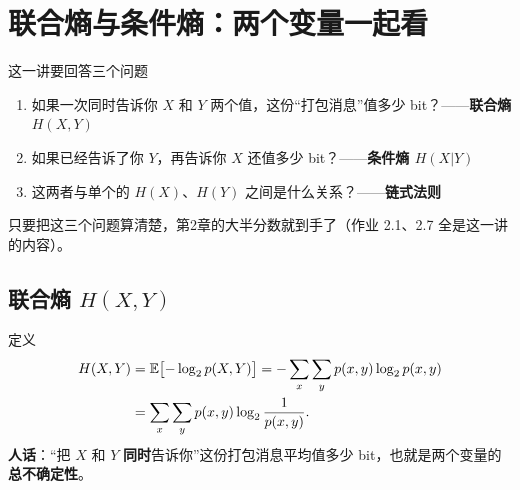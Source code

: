 \section{联合熵与条件熵：两个变量一起看}

\begin{idea}{这一讲要回答三个问题}
\begin{enumerate}[leftmargin=1.6em,itemsep=2pt,topsep=2pt]
  \item 如果一次同时告诉你 $X$ 和 $Y$ 两个值，这份“打包消息”值多少 bit？——\textbf{联合熵 $H(X,Y)$}
  \item 如果已经告诉了你 $Y$，再告诉你 $X$ 还值多少 bit？——\textbf{条件熵 $H(X|Y)$}
  \item 这两者与单个的 $H(X)$、$H(Y)$ 之间是什么关系？——\textbf{链式法则}
\end{enumerate}
只要把这三个问题算清楚，第2章的大半分数就到手了（作业 2.1、2.7 全是这一讲的内容）。
\end{idea}

\subsection{联合熵 $H(X,Y)$}

\begin{defbox}{定义}
\begin{align*}
H\!\left(X,Y\right)&=\operatorname{\mathbb{E}}\bigl[-\log_{2} p(X,Y)\bigr]
=-\sum_{x}\sum_{y}p(x,y)\log_{2} p(x,y)\\
&=\sum_{x}\sum_{y}p(x,y)\log_{2}\frac{1}{p(x,y)} .
\end{align*}
\textbf{人话}：“把 $X$ 和 $Y$ \textbf{同时}告诉你”这份打包消息平均值多少 bit，也就是两个变量的\textbf{总不确定性}。
\end{defbox}

